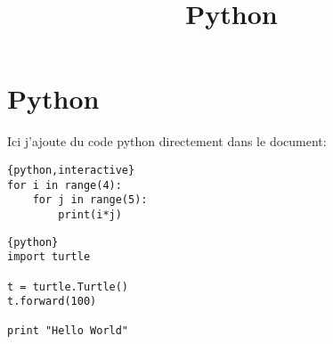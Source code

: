 \documentclass[a4paper,11pt]{article}
\begin{document}
\title{Python}
\date{}
\maketitle


\section{Python}
Ici j'ajoute du code python directement dans le document:\par
\begin{verbatim}{python,interactive}
for i in range(4):
    for j in range(5):
        print(i*j)
\end{verbatim}

\begin{verbatim}{python}
import turtle

t = turtle.Turtle()
t.forward(100)

print "Hello World"
\end{verbatim}
\end{document}

